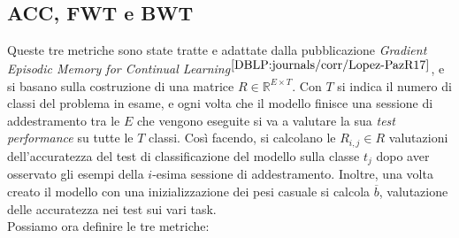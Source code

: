 \subsection{ACC, FWT e BWT}
Queste tre metriche sono state tratte e adattate dalla pubblicazione \textit{Gradient Episodic Memory for Continual Learning}$^{\cite{DBLP:journals/corr/Lopez-PazR17}}$, e si basano sulla costruzione di una matrice $R \in \mathbb{R}^{E\times T}$. Con $T$ si indica il numero di classi del problema in esame, e ogni volta che il modello finisce una sessione di addestramento tra le $E$ che vengono eseguite si va a valutare la sua \textit{test performance} su tutte le $T$ classi. Così facendo, si calcolano le $R_{i,j}\in R$ valutazioni dell'accuratezza del test di classificazione del modello sulla classe $t_j$ dopo aver osservato gli esempi della $i$-esima sessione di addestramento. Inoltre, una volta creato il modello con una inizializzazione dei pesi casuale si calcola $\overline{b}$, valutazione delle accuratezza nei test sui vari task.\\
Possiamo ora definire le tre metriche:
